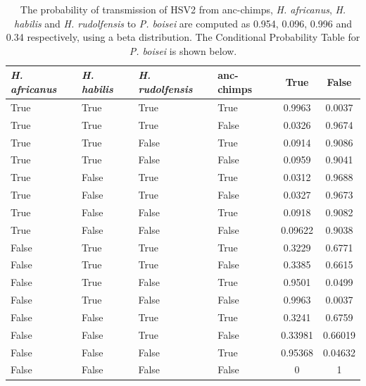 \documentclass[fleqn,10pt]{wlscirep}
\begin{document}
\begin{table}[!h]
	\centering
	\caption{The probability of transmission of HSV2 from anc-chimps, \textit{H. africanus}, \textit{H. habilis} and \textit{H. rudolfensis} to \textit{P. boisei} are computed as 0.954, 0.096, 0.996 and 0.34 respectively, using a beta distribution. The Conditional Probability Table for \textit{P. boisei} is shown below.}
	\label{table:cpt-boisei}  
	\begin{tabular}{l l l l c c}
		\toprule
		\textit{H. africanus}	&	\textit{H. habilis}	&	\textit{H. rudolfensis}	&	anc-chimps	&	True	&	False	\\
		\midrule
		True	&	True	&	True	&	True	&	0.9963	&	0.0037	\\
		True	&	True	&	True	&	False	&	0.0326	&	0.9674	\\
		True	&	True	&	False	&	True	&	0.0914	&	0.9086	\\
		True	&	True	&	False	&	False	&	0.0959	&	0.9041	\\
		True	&	False	&	True	&	True	&	0.0312	&	0.9688	\\
		True	&	False	&	True	&	False	&	0.0327	&	0.9673	\\
		True	&	False	&	False	&	True	&	0.0918	&	0.9082	\\
		True	&	False	&	False	&	False	&	0.09622	&	0.9038	\\
		False	&	True	&	True	&	True	&	0.3229	&	0.6771	\\
		False	&	True	&	True	&	False	&	0.3385	&	0.6615	\\
		False	&	True	&	False	&	True	&	0.9501	&	0.0499	\\
		False	&	True	&	False	&	False	&	0.9963	&	0.0037	\\
		False	&	False	&	True	&	True	&	0.3241	&	0.6759	\\
		False	&	False	&	True	&	False	&	0.33981	&	0.66019	\\
		False	&	False	&	False	&	True	&	0.95368	&	0.04632	\\
		False	&	False	&	False	&	False	&	0	&	1	\\
		\bottomrule
	\end{tabular}
\end{table}
\end{document}
